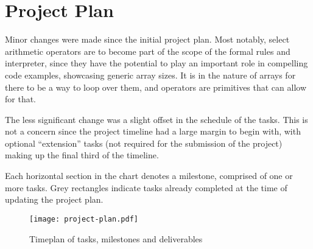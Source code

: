 \section{Project Plan}

Minor changes were made since the initial project plan. Most notably, select
arithmetic operators are to become part of the scope of the formal rules and
interpreter, since they have the potential to play an important role in
compelling code examples, showcasing generic array sizes. It is in the nature of
arrays for there to be a way to loop over them, and operators are primitives
that can allow for that.

The less significant change was a slight offset in the schedule of the tasks.
This is not a concern since the project timeline had a large margin to begin
with, with optional ``extension'' tasks (not required for the submission of the
project) making up the final third of the timeline.

Each horizontal section in the chart denotes a milestone, comprised of one or
more tasks. Grey rectangles indicate tasks already completed at the time of
updating the project plan.

\begin{figure}[h]
    \texttt{[image: project-plan.pdf]}
    \caption{Timeplan of tasks, milestones and deliverables}
\end{figure}
